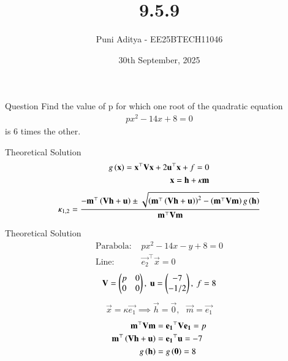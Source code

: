\documentclass{beamer}
\title{9.5.9}
\date{30th September, 2025}
\author{Puni Aditya - EE25BTECH11046}
\begin{document}
\frame{\titlepage}
\begin{frame}{Question}
Find the value of p for which one root of the quadratic equation 
\begin{align*}
    px^2 - 14x + 8 = 0
\end{align*}
is 6 times the other.

\end{frame}

\begin{frame}{Theoretical Solution}
\begin{align*}
    g\left(\mathbf{x}\right) = \mathbf{x}^\top\mathbf{V}\mathbf{x} + 2\mathbf{u}^\top\mathbf{x} + f = 0 \\
    \mathbf{x} = \mathbf{h} + \kappa\mathbf{m}
\end{align*}
\begin{align}
    \kappa_{1,2} = \frac{-\mathbf{m}^\top\left(\mathbf{V}\mathbf{h}+\mathbf{u}\right) \pm \sqrt{\left(\mathbf{m}^\top\left(\mathbf{V}\mathbf{h}+\mathbf{u}\right)\right)^2 - \left(\mathbf{m}^\top\mathbf{V}\mathbf{m}\right)g\left(\mathbf{h}\right)}}{\mathbf{m}^\top\mathbf{V}\mathbf{m}}
\end{align}
\end{frame}

\begin{frame}{Theoretical Solution}
\begin{align*}
    \text{Parabola: } &px^2 - 14x - y + 8 = 0 \\
    \text{Line: } &\vec{e_2}^\top\vec{x} = 0
\end{align*}
\begin{align}
    \mathbf{V} = \begin{pmatrix}p & 0 \\ 0 & 0\end{pmatrix}, \text{ } \mathbf{u} = \begin{pmatrix}-7 \\ -1/2\end{pmatrix}, \text{ } f = 8
\end{align}
\begin{align}
    \vec{x} = \kappa\vec{e_1} \implies \vec{h} = \vec{0}, \text{ } \vec{m} = \vec{e_1}
\end{align}
\begin{align}
    \mathbf{m}^\top\mathbf{V}\mathbf{m} &= \mathbf{e_1}^\top\mathbf{V}\mathbf{e_1} = p \\
    \mathbf{m}^\top\left(\mathbf{V}\mathbf{h} + \mathbf{u}\right) &= \mathbf{e_1}^\top\mathbf{u} = -7 \\
    g\left(\mathbf{h}\right) &= g\left(\mathbf{0}\right) = 8
\end{align}
\end{frame}
\end{document}
